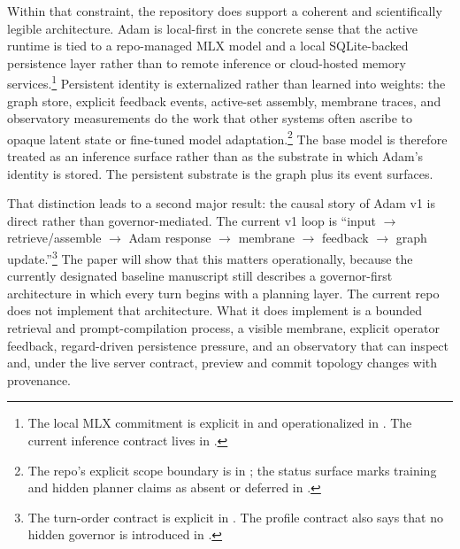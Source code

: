 \documentclass[10pt]{article}
\begin{document}
Within that constraint, the repository does support a coherent and scientifically legible architecture. Adam is local-first in the concrete sense that the active runtime is tied to a repo-managed MLX model and a local SQLite-backed persistence layer rather than to remote inference or cloud-hosted memory services.\footnote{The local MLX commitment is explicit in  and operationalized in . The current inference contract lives in .} Persistent identity is externalized rather than learned into weights: the graph store, explicit feedback events, active-set assembly, membrane traces, and observatory measurements do the work that other systems often ascribe to opaque latent state or fine-tuned model adaptation.\footnote{The repo's explicit scope boundary is in ; the status surface marks training and hidden planner claims as absent or deferred in .} The base model is therefore treated as an inference surface rather than as the substrate in which Adam's identity is stored. The persistent substrate is the graph plus its event surfaces.

That distinction leads to a second major result: the causal story of Adam v1 is direct rather than governor-mediated. The current v1 loop is ``input $\rightarrow$ retrieve/assemble $\rightarrow$ Adam response $\rightarrow$ membrane $\rightarrow$ feedback $\rightarrow$ graph update.''\footnote{The turn-order contract is explicit in . The profile contract also says that no hidden governor is introduced in .} The paper will show that this matters operationally, because the currently designated baseline manuscript still describes a governor-first architecture in which every turn begins with a planning layer. The current repo does not implement that architecture. What it does implement is a bounded retrieval and prompt-compilation process, a visible membrane, explicit operator feedback, regard-driven persistence pressure, and an observatory that can inspect and, under the live server contract, preview and commit topology changes with provenance.
\end{document}

